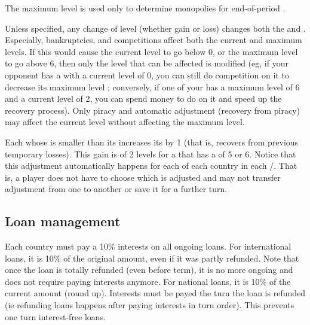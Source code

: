  The maximum level is used only to determine monopolies
for end-of-period \VPs.

 Unless specified, any change of level (whether gain
or loss) changes both the  and .
\bparag Especially, bankruptcies, \TFI and competitions affect both the
current and maximum levels.
\bparag If this would cause the current level to go below 0, or the maximum
level to go above 6, then only the level that can be affected is modified (eg,
if your opponent has a \TradeFLEET with a current level of 0, you can still do
competition on it to decrease its maximum level ; conversely, if one of your
\TradeFLEET has a maximum level of 6 and a current level of 2, you can spend
money to do \TFI on it and speed up the recovery process).
\bparag Only piracy and automatic adjustment (recovery from piracy) may affect
the current level without affecting the maximum level.

 Each \TradeFLEET whose  is
smaller than its  increases its  by
1 (that is, recovers from previous temporary losses).
\bparag This gain is of 2 levels for a \TradeFLEET that has a  of 5 or 6. %
\bparag Notice that this adjustment automatically happens for each \TradeFLEET
of each country in each \CTZ/\STZ. That is, a player does not have to choose
which \TradeFLEET is adjusted and may not transfer adjustment from one
\TradeFLEET to another or save it for a further turn.




\subsection{Loan management}

\aparag[Interests] Each country must pay a 10\% interests on all ongoing
loans.
\bparag For international loans, it is 10\% of the original amount, even if it
was partly refunded. Note that once the loan is totally refunded (even before
term), it is no more ongoing and does not require paying interests anymore.
\bparag For national loans, it is 10\% of the current amount (round up).
\bparag Interests must be payed the turn the loan is refunded (ie refunding
loans happens after paying interests in turn order). This prevents one turn
interest-free loans.

